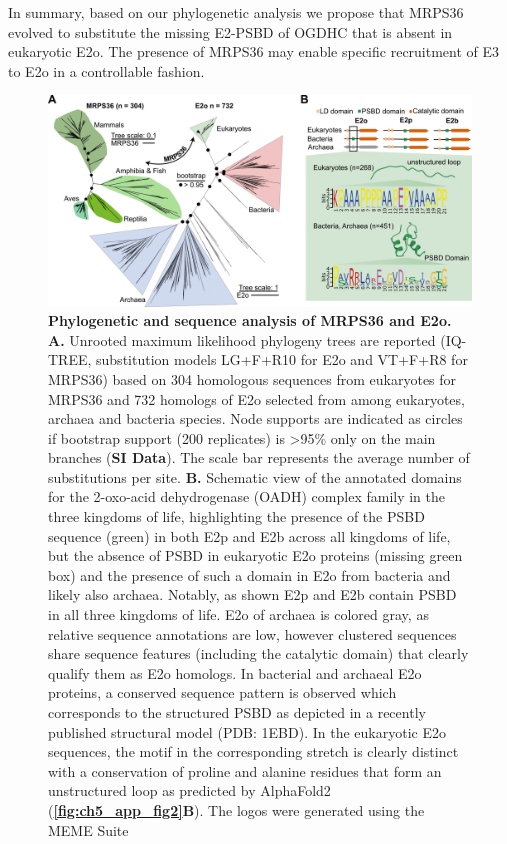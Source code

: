 In summary, based on our phylogenetic analysis we propose that MRPS36 evolved to substitute the missing E2-PSBD of OGDHC that is absent in eukaryotic E2o. The presence of MRPS36 may enable specific recruitment of E3 to E2o in a controllable fashion.
\raggedbottom
\begin{figure}[b!]
	\centering
	\includegraphics[]{Chapter.5/Figures/Figure3.png}
	\caption{\textbf{Phylogenetic and sequence analysis of MRPS36 and E2o.} \textbf{A.} Unrooted maximum likelihood phylogeny trees are reported (IQ-TREE, substitution models LG+F+R10 for E2o and VT+F+R8 for MRPS36) based on 304 homologous sequences from eukaryotes for MRPS36 and 732 homologs of E2o selected from among eukaryotes, archaea and bacteria species. Node supports are indicated as circles if bootstrap support (200 replicates) is >95\% only on the main branches (\textbf{SI Data}). The scale bar represents the average number of substitutions per site. \textbf{B.} Schematic view of the annotated domains for the 2-oxo-acid dehydrogenase (OADH) complex family in the three kingdoms of life, highlighting the presence of the PSBD sequence (green) in both E2p and E2b across all kingdoms of life, but the absence of PSBD in eukaryotic E2o proteins (missing green box) and the presence of such a domain in E2o from bacteria and likely also archaea. Notably, as shown E2p and E2b contain PSBD in all three kingdoms of life. E2o of archaea is colored gray, as relative sequence annotations are low, however clustered sequences share sequence features (including the catalytic domain) that clearly qualify them as E2o homologs. In bacterial and archaeal E2o proteins, a conserved sequence pattern is observed which corresponds to the structured PSBD as depicted in a recently published structural model \cite{Mande_1996} (PDB: 1EBD). In the eukaryotic E2o sequences, the motif in the corresponding stretch is clearly distinct with a conservation of proline and alanine residues that form an unstructured loop as predicted by AlphaFold2 (\textbf{\autoref{fig:ch5_app_fig2}B}). The logos were generated using the MEME Suite \cite{Bailey_2015}}
	\label{fig:ch5_fig3}
\end{figure}
%
